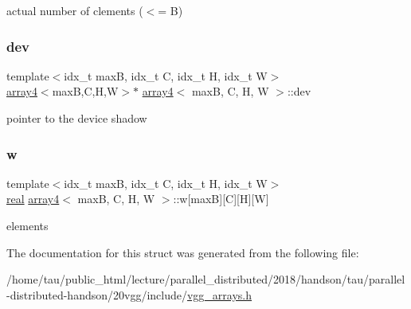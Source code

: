 actual number of clements ($<$= B) \mbox{\label{structarray4_a19e463f2ae72c48b92ac558f06366a17}} 
\subsubsection{\texorpdfstring{dev}{dev}}
{\footnotesize\ttfamily template$<$idx\+\_\+t maxB, idx\+\_\+t C, idx\+\_\+t H, idx\+\_\+t W$>$ \\
\hyperlink{structarray4}{array4}$<$maxB,C,H,W$>$$\ast$ \hyperlink{structarray4}{array4}$<$ maxB, C, H, W $>$\+::dev}

pointer to the device shadow \mbox{\label{structarray4_a08aad388f32b0c3ce10ab93c654c1317}} 
\subsubsection{\texorpdfstring{w}{w}}
{\footnotesize\ttfamily template$<$idx\+\_\+t maxB, idx\+\_\+t C, idx\+\_\+t H, idx\+\_\+t W$>$ \\
\hyperlink{vgg__util_8h_a1082d08aaa761215ec83e7149f27ad16}{real} \hyperlink{structarray4}{array4}$<$ maxB, C, H, W $>$\+::w\mbox{[}maxB\mbox{]}\mbox{[}C\mbox{]}\mbox{[}H\mbox{]}\mbox{[}W\mbox{]}}

elements 

The documentation for this struct was generated from the following file\+:\begin{DoxyCompactItemize}
\item 
/home/tau/public\+\_\+html/lecture/parallel\+\_\+distributed/2018/handson/tau/parallel-\/distributed-\/handson/20vgg/include/\hyperlink{vgg__arrays_8h}{vgg\+\_\+arrays.\+h}\end{DoxyCompactItemize}
